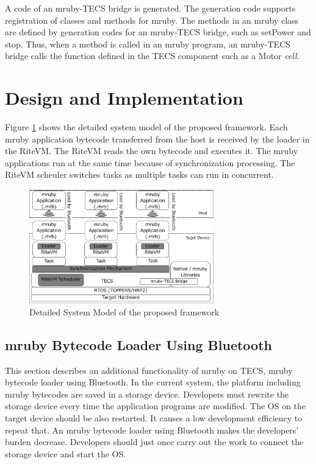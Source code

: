 \documentclass[conference,compsoc]{IEEEtran}
\begin{document}
A code of an mruby-TECS bridge is generated.
The generation code supports registration of classes and methods for mruby.
The methods in an mruby class are defined by generation codes for an mruby-TECS bridge, such as setPower and stop.
Thus, when a method is called in an mruby program, an mruby-TECS bridge calls the function defined in the TECS component such as a Motor {\it cell}.
 
\section{Design and Implementation}
\label{sec:Design and Implementation}
Figure \ref{fig:system_model} shows the detailed system model of the proposed framework.
Each mruby application bytecode transferred from the host is received by the loader in the RiteVM.
The RiteVM reads the own bytecode and executes it.
The mruby applications run at the same time because of synchronization processing.
The RiteVM scheuler switches tasks as multiple tasks can run in concurrent.

\begin{figure}[t]
    \centering
    \includegraphics[width=8cm,clip]{figure/system_model.pdf}
    \caption{Detailed System Model of the proposed framework}
    \label{fig:system_model}
\end{figure}

\subsection{mruby Bytecode Loader Using Bluetooth}
\label{sec:mruby bytecode loader using Bluetooth}
This section describes an additional functionality of mruby on TECS, mruby bytecode loader using Bluetooth.
In the current system, the platform including mruby bytecodes are saved in a storage device.
Developers must rewrite the storage device every time the application programs are modified.
The OS on the target device should be also restarted.
It causes a low development efficiency to repeat that.
An mruby bytecode loader using Bluetooth makes the developers' burden decrease.
Developers should just once carry out the work to connect the storage device and start the OS. 
\end{document}
